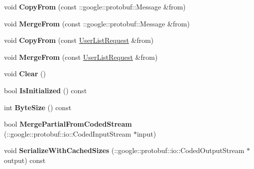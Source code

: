 \begin{DoxyCompactItemize}
\item 
\hypertarget{classSimpleChat_1_1UserListRequest_a0b9f4fd9c2b1681d503e73ab4520b338}{void {\bfseries Copy\-From} (const \-::google\-::protobuf\-::\-Message \&from)}\label{classSimpleChat_1_1UserListRequest_a0b9f4fd9c2b1681d503e73ab4520b338}

\item 
\hypertarget{classSimpleChat_1_1UserListRequest_a0b16ebd3e4c4d309c36601e874ce096b}{void {\bfseries Merge\-From} (const \-::google\-::protobuf\-::\-Message \&from)}\label{classSimpleChat_1_1UserListRequest_a0b16ebd3e4c4d309c36601e874ce096b}

\item 
\hypertarget{classSimpleChat_1_1UserListRequest_ab7727ed54ac9484bb37c2ed6183daf92}{void {\bfseries Copy\-From} (const \hyperlink{classSimpleChat_1_1UserListRequest}{User\-List\-Request} \&from)}\label{classSimpleChat_1_1UserListRequest_ab7727ed54ac9484bb37c2ed6183daf92}

\item 
\hypertarget{classSimpleChat_1_1UserListRequest_aff4c8bebd90862effd88416b5403e54d}{void {\bfseries Merge\-From} (const \hyperlink{classSimpleChat_1_1UserListRequest}{User\-List\-Request} \&from)}\label{classSimpleChat_1_1UserListRequest_aff4c8bebd90862effd88416b5403e54d}

\item 
\hypertarget{classSimpleChat_1_1UserListRequest_af48c6b644eb5e6a37125a1a87288ef95}{void {\bfseries Clear} ()}\label{classSimpleChat_1_1UserListRequest_af48c6b644eb5e6a37125a1a87288ef95}

\item 
\hypertarget{classSimpleChat_1_1UserListRequest_ac0833eb07d6b4e7d9f9f938a2623d27c}{bool {\bfseries Is\-Initialized} () const }\label{classSimpleChat_1_1UserListRequest_ac0833eb07d6b4e7d9f9f938a2623d27c}

\item 
\hypertarget{classSimpleChat_1_1UserListRequest_a226f6ed818edf08eef908be4fc07e0d1}{int {\bfseries Byte\-Size} () const }\label{classSimpleChat_1_1UserListRequest_a226f6ed818edf08eef908be4fc07e0d1}

\item 
\hypertarget{classSimpleChat_1_1UserListRequest_aabb1b42c320c44b6fe097e35c45f6f4d}{bool {\bfseries Merge\-Partial\-From\-Coded\-Stream} (\-::google\-::protobuf\-::io\-::\-Coded\-Input\-Stream $\ast$input)}\label{classSimpleChat_1_1UserListRequest_aabb1b42c320c44b6fe097e35c45f6f4d}

\item 
\hypertarget{classSimpleChat_1_1UserListRequest_a19e979aa2c6941a062031a6de6614057}{void {\bfseries Serialize\-With\-Cached\-Sizes} (\-::google\-::protobuf\-::io\-::\-Coded\-Output\-Stream $\ast$output) const }\label{classSimpleChat_1_1UserListRequest_a19e979aa2c6941a062031a6de6614057}


\end{DoxyCompactItemize}
